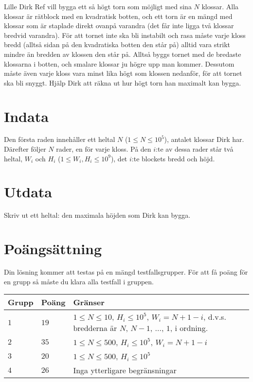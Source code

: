 Lille Dirk Ref vill bygga ett så högt torn som möjligt med sina $N$ klossar. Alla klossar är rätblock med en kvadratisk botten,
och ett torn är en mängd med klossar som är staplade direkt ovanpå varandra (det får inte ligga två klossar bredvid varandra).
För att tornet inte ska bli instabilt och rasa måste varje kloss bredd (alltså sidan på den kvadratiska botten den står på)
alltid vara strikt mindre än bredden av klossen den står på. Alltså byggs tornet med de bredaste klossarna i botten, och smalare
klossar ju högre upp man kommer. Dessutom måste även varje kloss vara minst lika högt som klossen nedanför, för att tornet ska bli snyggt.
Hjälp Dirk att räkna ut hur högt torn han maximalt kan bygga.

\section*{Indata}
Den första raden innehåller ett heltal $N$ ($1 \leq N \leq 10^5$), antalet klossar Dirk har.
Därefter följer $N$ rader, en för varje kloss. På den $i$:te av dessa rader står två heltal, $W_i$ och $H_i$ ($1 \leq W_i, H_i \leq 10^9$),
det $i$:te blockets bredd och höjd.

\section*{Utdata}
Skriv ut ett heltal: den maximala höjden som Dirk kan bygga.

\section*{Poängsättning}
Din lösning kommer att testas på en mängd testfallsgrupper. För att få poäng för en grupp så måste du klara alla testfall i gruppen.


\noindent
\begin{tabular}{| l | l | p{12cm} |}
  \hline
  \textbf{Grupp} & \textbf{Poäng} & \textbf{Gränser} \\ \hline
  $1$    & $19$      & $1 \leq N \leq 10$, $H_i \le 10^5$, $W_i = N+1 - i$, d.v.s. bredderna är $N$, $N-1$, $\dots$, $1$, i ordning. \\ \hline
  $2$    & $35$      & $1 \leq N \leq 500$, $H_i \le 10^5$, $W_i = N+1 - i$ \\ \hline
  $3$    & $20$      & $1 \leq N \leq 500$, $H_i \le 10^5$ \\ \hline
  $4$    & $26$      & Inga ytterligare begränsningar  \\ \hline
\end{tabular}


